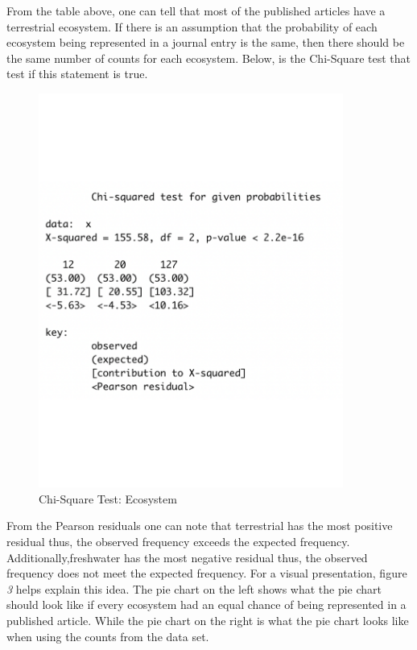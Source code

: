 \documentclass[
]{article}
\begin{document}
From the table above, one can tell that most of the published articles
have a terrestrial ecosystem. If there is an assumption that the
probability of each ecosystem being represented in a journal entry is
the same, then there should be the same number of counts for each
ecosystem. Below, is the Chi-Square test that test if this statement is
true.

\begin{figure}
  \caption{Chi-Square Test: Ecosystem}
    \includegraphics[width=10cm]{chi-eco-1.pdf}
\end{figure}

From the Pearson residuals one can note that terrestrial has the most
positive residual thus, the observed frequency exceeds the expected
frequency. Additionally,freshwater has the most negative residual thus,
the observed frequency does not meet the expected frequency. For a
visual presentation, figure \emph{3} helps explain this idea. The pie
chart on the left shows what the pie chart should look like if every
ecosystem had an equal chance of being represented in a published
article. While the pie chart on the right is what the pie chart looks
like when using the counts from the data set.
\end{document}
